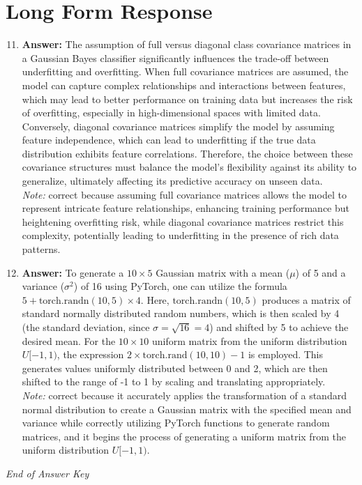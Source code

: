 \documentclass[12pt]{article}
\begin{document}
\section*{Long Form Response}
\begin{enumerate}[label=\arabic*.]
\setcounter{enumi}{10}
\item \textbf{Answer:} The assumption of full versus diagonal class covariance matrices in a Gaussian Bayes classifier significantly influences the trade-off between underfitting and overfitting. When full covariance matrices are assumed, the model can capture complex relationships and interactions between features, which may lead to better performance on training data but increases the risk of overfitting, especially in high-dimensional spaces with limited data. Conversely, diagonal covariance matrices simplify the model by assuming feature independence, which can lead to underfitting if the true data distribution exhibits feature correlations. Therefore, the choice between these covariance structures must balance the model's flexibility against its ability to generalize, ultimately affecting its predictive accuracy on unseen data.
\\ \textit{Note:} correct because assuming full covariance matrices allows the model to represent intricate feature relationships, enhancing training performance but heightening overfitting risk, while diagonal covariance matrices restrict this complexity, potentially leading to underfitting in the presence of rich data patterns.
\item \textbf{Answer:} To generate a $10 \times 5$ Gaussian matrix with a mean ($\mu$) of 5 and a variance ($\sigma^2$) of 16 using PyTorch, one can utilize the formula \(5 + \text{torch.randn}(10, 5) \times 4\). Here, \(\text{torch.randn}(10, 5)\) produces a matrix of standard normally distributed random numbers, which is then scaled by 4 (the standard deviation, since \(\sigma = \sqrt{16} = 4\)) and shifted by 5 to achieve the desired mean. For the $10 \times 10$ uniform matrix from the uniform distribution \(U[-1,1)\), the expression \(2 \times \text{torch.rand}(10, 10) - 1\) is employed. This generates values uniformly distributed between 0 and 2, which are then shifted to the range of -1 to 1 by scaling and translating appropriately.
\\ \textit{Note:} correct because it accurately applies the transformation of a standard normal distribution to create a Gaussian matrix with the specified mean and variance while correctly utilizing PyTorch functions to generate random matrices, and it begins the process of generating a uniform matrix from the uniform distribution \(U[-1,1)\).
\end{enumerate}

\vfill
\noindent\textit{End of Answer Key}
\end{document}
